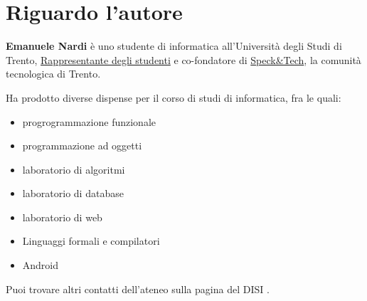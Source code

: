 \section*{Riguardo l'autore}

\textbf{Emanuele Nardi} è uno studente di informatica all'Università degli Studi di Trento, \href{}{Rappresentante degli studenti} e co-fondatore di \href{http://speckand.tech}{Speck\&Tech}, la comunità tecnologica di Trento.

\medskip
Ha prodotto diverse dispense per il corso di studi di informatica, fra le quali:
\begin{itemize}
	\item progrogrammazione funzionale
	\item programmazione ad oggetti
	\item laboratorio di algoritmi
	\item laboratorio di database
	\item laboratorio di web
	\item Linguaggi formali e compilatori
	\item Android
\end{itemize}

\medskip
Puoi trovare altri contatti dell'ateneo sulla pagina del DISI %
\href{http://offertaformativa.unitn.it/it/l/informatica/contatti-e-referenti}{\ExternalLink}.
